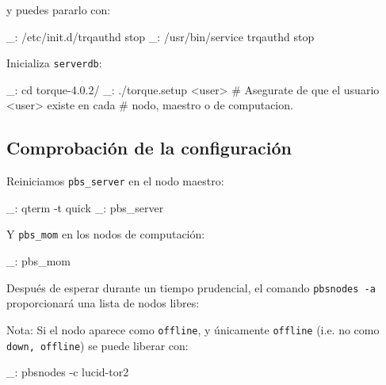 y puedes pararlo con:

\begin{bashcode}
_: /etc/init.d/trqauthd stop
_: /usr/bin/service trqauthd stop
\end{bashcode}

Inicializa \texttt{serverdb}:

\begin{bashcode}
_: cd torque-4.0.2/
_: ./torque.setup <user>   # Asegurate de que el usuario <user> existe en cada
                           # nodo, maestro o de computacion.
\end{bashcode}


\subsection{Comprobación de la configuración}


Reiniciamos \texttt{pbs\_server} en el nodo maestro:

\begin{bashcode}
_: qterm -t quick
_: pbs_server
\end{bashcode}

Y \texttt{pbs\_mom} en los nodos de computación:

\begin{bashcode}
_: pbs_mom
\end{bashcode}

Después de esperar durante un tiempo prudencial, el comando \texttt{pbsnodes -a} proporcionará una lista de nodos libres:


Nota: Si el nodo aparece como \texttt{offline}, y únicamente \texttt{offline} (i.e. no como \texttt{down, offline}) se puede liberar con:

\begin{bashcode}
_: pbsnodes -c lucid-tor2
\end{bashcode}

